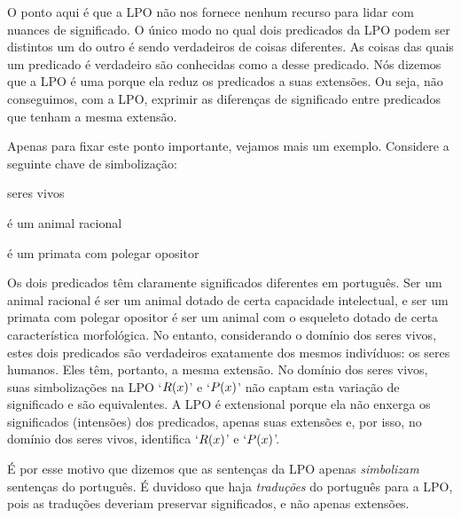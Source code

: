 O ponto aqui é que a LPO não nos fornece nenhum recurso para lidar com nuances de significado.
O único modo no qual dois predicados da LPO podem ser distintos um do outro é sendo verdadeiros de coisas diferentes.
As coisas das quais um predicado é verdadeiro são conhecidas como a  desse predicado.
Nós dizemos que a LPO é uma  porque ela reduz os predicados a suas extensões.
Ou seja, não conseguimos, com a LPO, exprimir as diferenças de significado entre predicados que tenham a mesma extensão.    

Apenas para fixar este ponto importante, vejamos mais um exemplo.
Considere a seguinte chave de simbolização:
\begin{center}
	\begin{ekey}
		\item[\text{domínio}] seres vivos
		\item[\atom{R}{x}]  é um animal racional
		\item[\atom{P}{x}]  é um primata com polegar opositor
	\end{ekey}
\end{center}
Os dois predicados têm claramente significados diferentes em português.
Ser um animal racional é ser um animal dotado de certa capacidade intelectual, e ser um primata com polegar opositor é ser um animal com o esqueleto dotado de certa característica morfológica.
No entanto, considerando o domínio dos seres vivos, estes dois predicados são verdadeiros exatamente dos mesmos indivíduos:
os seres humanos.
Eles têm, portanto, a mesma extensão.
No domínio dos seres vivos, suas simbolizações na LPO `$\mathord{R}(x)$' e `$\mathord{P}(x)$' não captam esta variação de significado e são equivalentes.
A LPO é extensional porque ela não enxerga os significados (intensões) dos predicados, apenas suas extensões e, por isso, no domínio dos seres vivos, identifica `$\mathord{R}(x)$' e `$\mathord{P}(x)$'.

É por esse motivo que dizemos que as sentenças da LPO apenas \emph{simbolizam} sentenças do português.
É duvidoso que haja \emph{traduções} do português para a LPO, pois as traduções deveriam preservar significados, e não apenas extensões.


